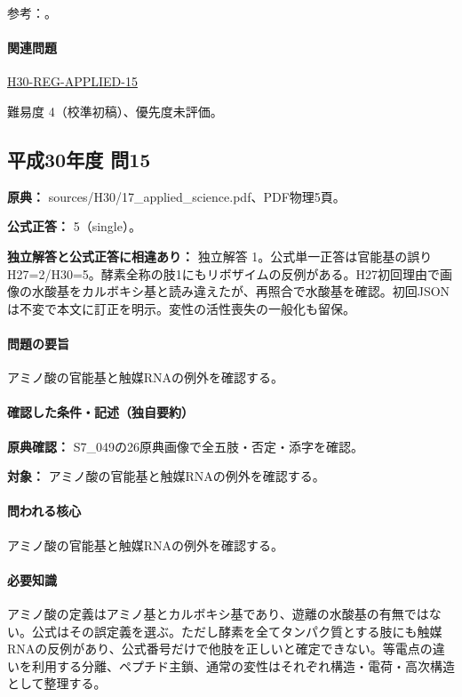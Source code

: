 \par 参考：\cite{analysis49_amino_ref,analysis49_rna_ref}。

\paragraph{関連問題} \hyperref[q:h30-reg-applied-15]{H30-REG-APPLIED-15}

\par 難易度 4（校準初稿）、優先度未評価。

\subsection{平成30年度 問15}
\label{q:h30-reg-applied-15}

\noindent\textbf{原典：} sources/H30/17\_applied\_science.pdf、PDF物理5頁。

\textbf{公式正答：} 5（single）。

\par\textbf{独立解答と公式正答に相違あり：} 独立解答 1。公式単一正答は官能基の誤りH27=\allowbreak{}2/H30=\allowbreak{}5。酵素全称の肢1にもリボザイムの反例がある。H27初回理由で画像の水酸基をカルボキシ基と読み違えたが、再照合で水酸基を確認。初回JSONは不変で本文に訂正を明示。変性の活性喪失の一般化も留保。

\paragraph{問題の要旨} アミノ酸の官能基と触媒RNAの例外を確認する。

\paragraph{確認した条件・記述（独自要約）}\mbox{}\par

\noindent\textbf{原典確認：} S7\_049の26原典画像で全五肢・否定・添字を確認。\par

\noindent\textbf{対象：} アミノ酸の官能基と触媒RNAの例外を確認する。\par

\paragraph{問われる核心} アミノ酸の官能基と触媒RNAの例外を確認する。

\paragraph{必要知識} アミノ酸の定義はアミノ基とカルボキシ基であり、遊離の水酸基の有無ではない。公式はその誤定義を選ぶ。ただし酵素を全てタンパク質とする肢にも触媒RNAの反例があり、公式番号だけで他肢を正しいと確定できない。等電点の違いを利用する分離、ペプチド主鎖、通常の変性はそれぞれ構造・電荷・高次構造として整理する。

